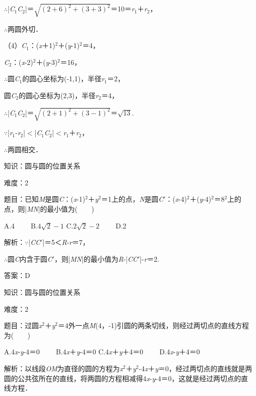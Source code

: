 \documentclass{article} %
\begin{document}
$\mathrm{\therefore}$|\textit{C}${}_{1}$\textit{C}${}_{2}$|＝$\sqrt{(2+6)^2+(3+3)^2}$＝10＝\textit{r}${}_{1}$＋\textit{r}${}_{2}$，

$\mathrm{\therefore}$两圆外切．

（4）\textit{C}${}_{1}$：(\textit{x}＋1)${}^{2}$＋(\textit{y}-1)${}^{2}$＝4，

\textit{C}${}_{2}$：(\textit{x}-2)${}^{2}$＋(\textit{y}-3)${}^{2}$＝16，

$\mathrm{\therefore}$圆\textit{C}${}_{1}$的圆心坐标为(-1,1)，半径\textit{r}${}_{1}$＝2，

圆\textit{C}${}_{2}$的圆心坐标为(2,3)，半径\textit{r}${}_{2}$＝4，

$\mathrm{\therefore}$|\textit{C}${}_{1}$\textit{C}${}_{2}$|＝$\sqrt{(2+1)^2+(3-1)^2}$＝$\sqrt{13}$.

$\mathrm{\because}$|\textit{r}${}_{1}$-\textit{r}${}_{2}$|$\mathrm{<}$|\textit{C}${}_{1}$\textit{C}${}_{2}$|$\mathrm{<}$\textit{r}${}_{1}$＋\textit{r}${}_{2}$，

$\mathrm{\therefore}$两圆相交．

知识：圆与圆的位置关系

难度：2

题目：已知\textit{M}是圆\textit{C}：(\textit{x}-1)${}^{2}$＋\textit{y}${}^{2}$＝1上的点，\textit{N}是圆\textit{C}$'$：(\textit{x}-4)${}^{2}$＋(\textit{y}-4)${}^{2}$＝8${}^{2}$上的点，则|\textit{MN}|的最小值为(　　)

A.4　　 B.$4\sqrt{2}-1$  C.$2\sqrt{2}-2$　　 D.2

解析：$\mathrm{\because}$|\textit{CC}$'$|＝5＜\textit{R}-\textit{r}＝7，

$\mathrm{\therefore}$圆\textit{C}内含于圆\textit{C}$'$，则|\textit{MN}|的最小值为\textit{R}-|\textit{CC}$'$|-\textit{r}＝2.

答案：D

知识：圆与圆的位置关系

难度：2

题目：过圆\textit{x}${}^{2}$＋\textit{y}${}^{2}$＝4外一点\textit{M}(4，-1)引圆的两条切线，则经过两切点的直线方程为(　　)

A.4\textit{x}-\textit{y}-4＝0　　 B.4\textit{x}＋\textit{y}-4＝0 C.4\textit{x}＋\textit{y}＋4＝0　　 D.4\textit{x}-\textit{y}＋4＝0

解析：以线段\textit{OM}为直径的圆的方程为\textit{x}${}^{2}$＋\textit{y}${}^{2}$-4\textit{x}＋\textit{y}＝0，经过两切点的直线就是两圆的公共弦所在的直线，将两圆的方程相减得4\textit{x}-\textit{y}-4＝0，这就是经过两切点的直线方程．
\end{document}
